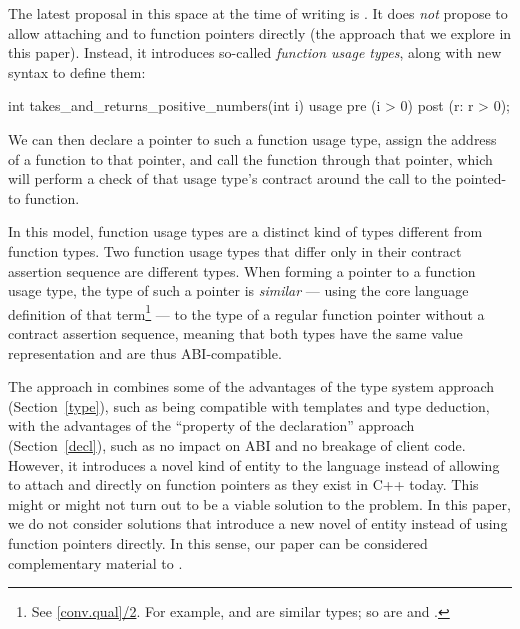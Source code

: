 The latest proposal in this space at the time of writing is \cite{P3271R0}. It does \emph{not} propose to allow attaching  and  to function pointers directly (the approach that we explore in this paper). Instead, it introduces so-called \emph{function usage types}, along with new syntax to define them:
\begin{codeblock}
int takes_and_returns_positive_numbers(int i) usage 
  pre (i > 0)
  post (r: r > 0);
\end{codeblock}
We can then declare a pointer to such a function usage type, assign the address of a function to that pointer, and call the function through that pointer, which will perform a check of that usage type's contract around the call to the pointed-to function.

In this model, function usage types are a distinct kind of types different from function types. Two function usage types that differ only in their contract assertion sequence are different types. When forming a pointer to a function usage type, the type of such a pointer is \emph{similar} --- using the core language definition of that term\footnote{See \href{https://timsong-cpp.github.io/cppwp/n4950/conv.qual\#2}{[conv.qual]/2}. For example,   and  are similar types; so are  and .} --- to the type of a regular function pointer without a contract assertion sequence, meaning that both types have the same value representation and are thus ABI-compatible.


The approach in \cite{P3271R0} combines some of the advantages of the type system approach (Section~\ref{type}), such as being compatible with templates and type deduction, with the advantages of the ``property of the declaration'' approach (Section~\ref{decl}), such as no impact on ABI and no breakage of client code. However, it introduces a novel kind of entity to the language instead of allowing to attach  and  directly on function pointers as they exist in C++ today. This might or might not turn out to be a viable solution to the problem. In this paper, we do not consider solutions that introduce a new novel of entity instead of using function pointers directly. In this sense, our paper can be considered complementary material to \cite{P3271R0}.

